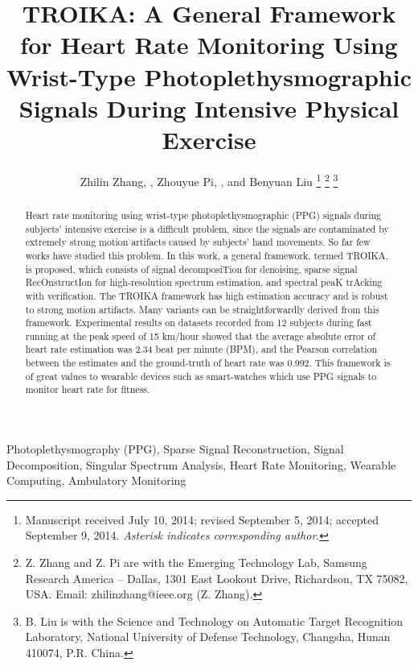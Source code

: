 \documentclass[10pt,twocolumn]{IEEEtran}
\begin{document}
\title{TROIKA: A General Framework for Heart Rate Monitoring Using Wrist-Type Photoplethysmographic Signals During Intensive Physical Exercise}

\author{Zhilin Zhang, , Zhouyue Pi, , and Benyuan Liu
\thanks{Manuscript received July 10, 2014; revised September 5, 2014; accepted September 9, 2014. \emph{Asterisk indicates corresponding author}.}
\thanks{Z. Zhang and Z. Pi are with the Emerging Technology Lab, Samsung Research America -- Dallas, 1301 East Lookout Drive, Richardson, TX 75082, USA. Email: zhilinzhang@ieee.org (Z. Zhang). }
\thanks{B. Liu is with the Science and Technology on Automatic Target Recognition Laboratory, National University of Defense Technology, Changsha, Hunan 410074, P.R. China. }
}




\maketitle


\begin{abstract}

Heart rate monitoring using wrist-type photoplethysmographic (PPG) signals during subjects' intensive exercise is a difficult problem, since the signals are contaminated by extremely strong motion artifacts caused by subjects' hand movements. So far few works have studied this problem. In this work, a general framework, termed TROIKA, is proposed, which consists of signal decomposiTion for denoising, sparse signal RecOnstructIon for high-resolution spectrum estimation, and spectral peaK trAcking with verification.
The TROIKA framework has high estimation accuracy and is robust to strong motion artifacts. Many variants can be straightforwardly derived from this framework. Experimental results on datasets recorded from 12 subjects during fast running at the peak speed of 15 km/hour showed that the average absolute error of heart rate estimation was 2.34 beat per minute (BPM), and the Pearson correlation between the estimates and the ground-truth of heart rate was 0.992. This framework is of great values to wearable devices such as smart-watches which use PPG signals to monitor heart rate for fitness.
\end{abstract}


\begin{keywords}
Photoplethysmography (PPG), Sparse Signal Reconstruction, Signal Decomposition, Singular Spectrum Analysis, Heart Rate Monitoring, Wearable Computing, Ambulatory Monitoring
\end{keywords}
\end{document}
